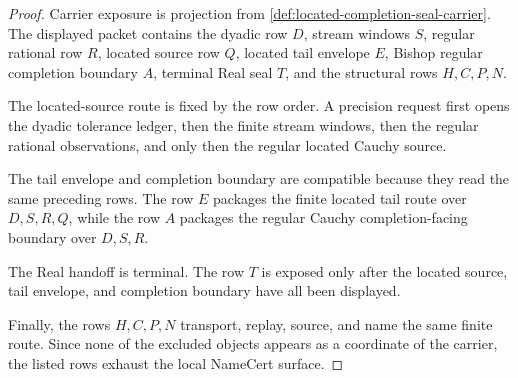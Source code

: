 \begin{proof}
Carrier exposure is projection from \autoref{def:located-completion-seal-carrier}. The displayed packet contains the dyadic row $D$, stream windows $S$, regular rational row $R$, located source row $Q$, located tail envelope $E$, Bishop regular completion boundary $A$, terminal Real seal $T$, and the structural rows $H,C,P,N$.

The located-source route is fixed by the row order. A precision request first opens the dyadic tolerance ledger, then the finite stream windows, then the regular rational observations, and only then the regular located Cauchy source.

The tail envelope and completion boundary are compatible because they read the same preceding rows. The row $E$ packages the finite located tail route over $D,S,R,Q$, while the row $A$ packages the regular Cauchy completion-facing boundary over $D,S,R$.

The Real handoff is terminal. The row $T$ is exposed only after the located source, tail envelope, and completion boundary have all been displayed.

Finally, the rows $H,C,P,N$ transport, replay, source, and name the same finite route. Since none of the excluded objects appears as a coordinate of the carrier, the listed rows exhaust the local NameCert surface.
\end{proof}

